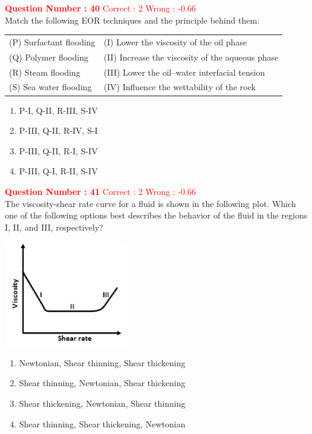 \documentclass[12pt]{article}
\begin{document}
{\textbf{\textcolor{red}{Question Number : 40}} \hfill \textcolor{red}{Correct : 2 Wrong : -0.66} \\[1ex]
Match the following EOR techniques and the principle behind them:

\begin{tabular}{ll}
(P) Surfactant flooding & (I) Lower the viscosity of the oil phase \\
(Q) Polymer flooding & (II) Increase the viscosity of the aqueous phase \\
(R) Steam flooding & (III) Lower the oil–water interfacial tension \\
(S) Sea water flooding & (IV) Influence the wettability of the rock \\
\end{tabular}

\begin{enumerate}[label=(\Alph*)]
    \item P-I, Q-II, R-III, S-IV \\
    \item P-III, Q-II, R-IV, S-I \\
    \item P-III, Q-II, R-I, S-IV \\
    \item P-III, Q-I, R-II, S-IV
\end{enumerate}

\textbf{\textcolor{red}{Question Number : 41}} \hfill \textcolor{red}{Correct : 2  Wrong : -0.66} \\[1ex]
The viscosity-shear rate curve for a fluid is shown in the following plot. Which one of the following options best describes the behavior of the fluid in the regions I, II, and III, respectively?

\begin{center}
    \includegraphics[width=0.4\textwidth]{Figs/Graph_Q41.png}
\end{center}

\begin{enumerate}[label=(\Alph*)]
    \item Newtonian, Shear thinning, Shear thickening
    \item Shear thinning, Newtonian, Shear thickening
    \item Shear thickening, Newtonian, Shear thinning
    \item Shear thinning, Shear thickening, Newtonian
\end{enumerate}

}
\end{document}
